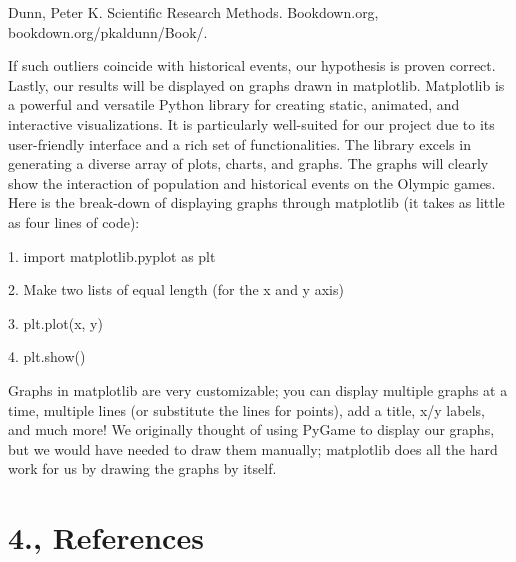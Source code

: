 \documentclass[fontsize=11pt]{article}
\begin{document}
Dunn, Peter K. Scientific Research Methods. Bookdown.org, bookdown.org/pkaldunn/Book/. 

If such outliers coincide with historical events, our hypothesis is proven correct. 
Lastly, our results will be displayed on graphs drawn in matplotlib. Matplotlib is a powerful and versatile Python library for creating static, animated, and interactive visualizations. It is particularly well-suited for our project due to its user-friendly interface and a rich set of functionalities. The library excels in generating a diverse array of plots, charts, and graphs.
The graphs will clearly show the interaction of population and historical events on the Olympic games. Here is the break-down of displaying graphs through matplotlib (it takes as little as four lines of code): 

1. import matplotlib.pyplot as plt 

2. Make two lists of equal length (for the x and y axis) 

3. plt.plot(x, y) 

4. plt.show() 

Graphs in matplotlib are very customizable; you can display multiple graphs at a time, multiple lines (or substitute the lines for points), add a title, x/y labels, and much more! We originally thought of using PyGame to display our graphs, but we would have needed to draw them manually; matplotlib does all the hard work for us by drawing the graphs by itself. 

\section*{4., References}
\end{document}
